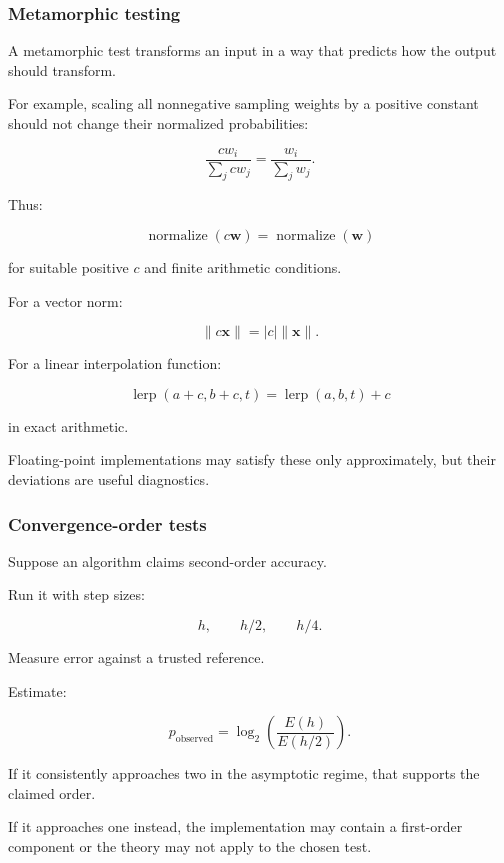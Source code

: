 \subsubsection{Metamorphic testing}\label{02-foundations-ii-ch031-metamorphic-testing}

A metamorphic test transforms an input in a way that predicts how the output should transform.

For example, scaling all nonnegative sampling weights by a positive constant should not change their normalized probabilities:

\[ \frac{cw_i}{\sum_jcw_j} = \frac{w_i}{\sum_jw_j}. \]

Thus:

\[ \boxed{ \operatorname{normalize}(c\mathbf w) = \operatorname{normalize}(\mathbf w) } \]

for suitable positive \(c\) and finite arithmetic conditions.

For a vector norm:

\[ \boxed{ \|c\mathbf x\|=|c|\|\mathbf x\| }. \]

For a linear interpolation function:

\[ \boxed{ \operatorname{lerp}(a+c,b+c,t) = \operatorname{lerp}(a,b,t)+c } \]

in exact arithmetic.

Floating-point implementations may satisfy these only approximately, but their deviations are useful diagnostics.

\subsubsection{Convergence-order tests}\label{02-foundations-ii-ch031-convergence-order-tests}

Suppose an algorithm claims second-order accuracy.

Run it with step sizes:

\[ h,\qquad h/2,\qquad h/4. \]

Measure error against a trusted reference.

Estimate:

\[ p_{\mathrm{observed}} = \log_2 \left( \frac{E(h)}{E(h/2)} \right). \]

If it consistently approaches two in the asymptotic regime, that supports the claimed order.

If it approaches one instead, the implementation may contain a first-order component or the theory may not apply to the chosen test.

